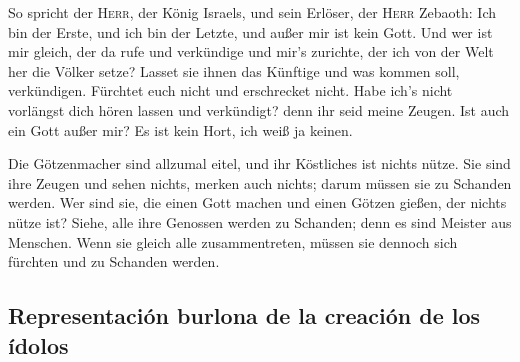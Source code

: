  So spricht der \textsc{Herr}, der König Israels, und sein
Erlöser, der \textsc{Herr} Zebaoth: Ich bin der Erste, und ich bin der
Letzte, und außer mir ist kein Gott.  Und wer ist mir
gleich, der da rufe und verkündige und mir's zurichte, der ich von der
Welt her die Völker setze? Lasset sie ihnen das Künftige und was kommen
soll, verkündigen.  Fürchtet euch nicht und erschrecket
nicht. Habe ich's nicht vorlängst dich hören lassen und verkündigt? denn
ihr seid meine Zeugen. Ist auch ein Gott außer mir? Es ist kein Hort,
ich weiß ja keinen.

 Die Götzenmacher sind allzumal eitel, und ihr Köstliches
ist nichts nütze. Sie sind ihre Zeugen und sehen nichts, merken auch
nichts; darum müssen sie zu Schanden werden.  Wer sind
sie, die einen Gott machen und einen Götzen gießen, der nichts nütze
ist?  Siehe, alle ihre Genossen werden zu Schanden; denn
es sind Meister aus Menschen. Wenn sie gleich alle zusammentreten,
müssen sie dennoch sich fürchten und zu Schanden werden.

\hypertarget{representaciuxf3n-burlona-de-la-creaciuxf3n-de-los-uxeddolos}{%
\subsection{Representación burlona de la creación de los
ídolos}\label{representaciuxf3n-burlona-de-la-creaciuxf3n-de-los-uxeddolos}}

